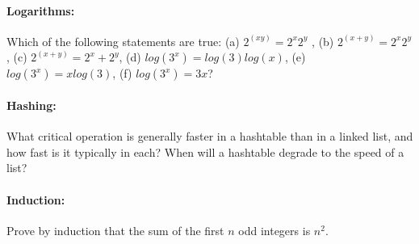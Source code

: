 \documentclass[12pt,twoside]{article}
\begin{document}
\vspace{4cm}

\paragraph{Logarithms:} Which of the following statements are true: (a) $2^{(xy)} = 2^x2^y$
, (b) $2^{(x+y)} = 2^x2^y$, (c) $2^{(x+y)} = 2^x + 2^y$, (d) $log(3^x) = log(3)log(x)$, (e) $log(3^x
) = x log(3)$, (f) $log(3^x) = 3x$?

\vspace{2cm}

\paragraph{Hashing:} What critical operation is generally faster in a hashtable than in a linked list, and how fast is it typically in each? When will a hashtable degrade to the speed of a list?

\clearpage


\paragraph{Induction:} Prove by induction that the sum of the first $n$ odd integers is $n^2$.
\end{document}
